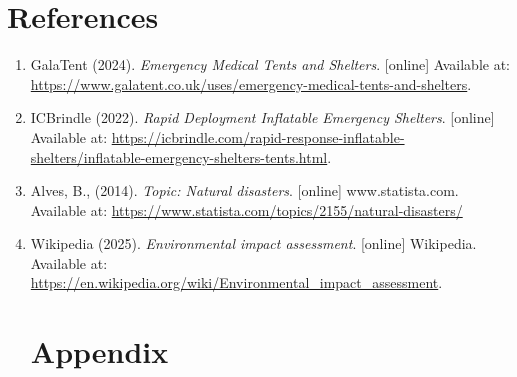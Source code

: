 \documentclass{article}
\begin{document}
\section{References}
\normalsize
\begin{enumerate}
\item GalaTent (2024). \textit{Emergency Medical Tents and Shelters}. [online] Available at: \url{https://www.galatent.co.uk/uses/emergency-medical-tents-and-shelters}.
\item ICBrindle (2022). \textit{Rapid Deployment Inflatable Emergency Shelters}. [online] Available at: \url{https://icbrindle.com/rapid-response-inflatable-shelters/inflatable-emergency-shelters-tents.html}.
\item Alves, B., (2014). \textit{Topic: Natural disasters}. [online] www.statista.com. Available at: \url{https://www.statista.com/topics/2155/natural-disasters/}
\item Wikipedia (2025). \textit{Environmental impact assessment}. [online] Wikipedia. Available at: \url{https://en.wikipedia.org/wiki/Environmental_impact_assessment}.

\newpage

\section{Appendix}
‌
\end{enumerate}
	
\end{document}
